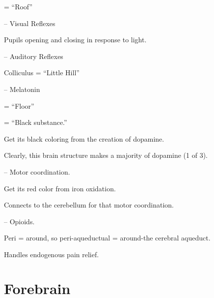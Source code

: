 \begin{coloredlist}
    \item {} = ``Roof''
    \begin{coloredlist}
        \item {} -- Visual Reflexes
        \begin{coloredlist}
            \item Pupils opening and closing in response to light.
        \end{coloredlist}
        \item {} -- Auditory Reflexes
        \item Colliculus = ``Little Hill''
        \item {} -- Melatonin
    \end{coloredlist}
    \item {} = ``Floor''
    \begin{coloredlist}
        \item {} = ``Black substance.''
        \begin{coloredlist}
            \item Get its black coloring from the creation of dopamine.
            \item Clearly, this brain structure makes a majority of dopamine (1 of 3).
        \end{coloredlist}
        \item {} -- Motor coordination.
        \begin{coloredlist}
            \item Get its red color from iron oxidation.
            \item Connects to the cerebellum for that motor coordination.
        \end{coloredlist}
        \item {} -- Opioids.
        \begin{coloredlist}
            \item Peri = around, so peri-aqueductual = around-the cerebral aqueduct. 
            \item Handles endogenous pain relief.
        \end{coloredlist}
    \end{coloredlist}
\end{coloredlist}

\section{Forebrain}

